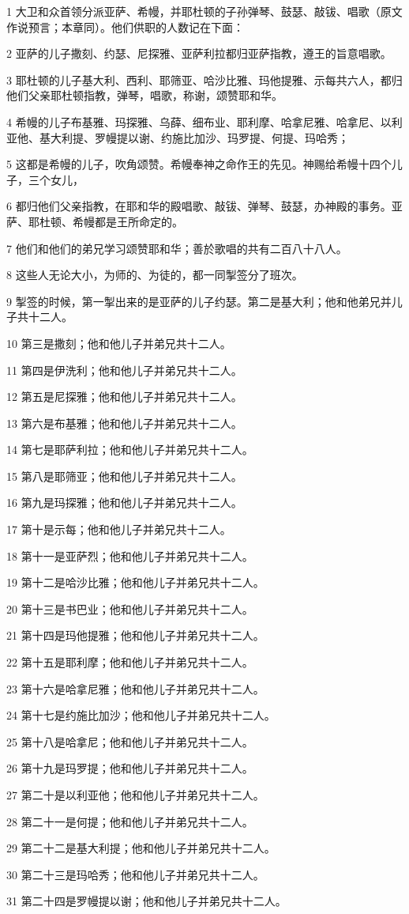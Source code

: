 \par 1 大卫和众首领分派亚萨、希幔，并耶杜顿的子孙弹琴、鼓瑟、敲钹、唱歌（原文作说预言；本章同）。他们供职的人数记在下面：
\par 2 亚萨的儿子撒刻、约瑟、尼探雅、亚萨利拉都归亚萨指教，遵王的旨意唱歌。
\par 3 耶杜顿的儿子基大利、西利、耶筛亚、哈沙比雅、玛他提雅、示每共六人，都归他们父亲耶杜顿指教，弹琴，唱歌，称谢，颂赞耶和华。
\par 4 希幔的儿子布基雅、玛探雅、乌薛、细布业、耶利摩、哈拿尼雅、哈拿尼、以利亚他、基大利提、罗幔提以谢、约施比加沙、玛罗提、何提、玛哈秀；
\par 5 这都是希幔的儿子，吹角颂赞。希幔奉神之命作王的先见。神赐给希幔十四个儿子，三个女儿，
\par 6 都归他们父亲指教，在耶和华的殿唱歌、敲钹、弹琴、鼓瑟，办神殿的事务。亚萨、耶杜顿、希幔都是王所命定的。
\par 7 他们和他们的弟兄学习颂赞耶和华；善於歌唱的共有二百八十八人。
\par 8 这些人无论大小，为师的、为徒的，都一同掣签分了班次。
\par 9 掣签的时候，第一掣出来的是亚萨的儿子约瑟。第二是基大利；他和他弟兄并儿子共十二人。
\par 10 第三是撒刻；他和他儿子并弟兄共十二人。
\par 11 第四是伊洗利；他和他儿子并弟兄共十二人。
\par 12 第五是尼探雅；他和他儿子并弟兄共十二人。
\par 13 第六是布基雅；他和他儿子并弟兄共十二人。
\par 14 第七是耶萨利拉；他和他儿子并弟兄共十二人。
\par 15 第八是耶筛亚；他和他儿子并弟兄共十二人。
\par 16 第九是玛探雅；他和他儿子并弟兄共十二人。
\par 17 第十是示每；他和他儿子并弟兄共十二人。
\par 18 第十一是亚萨烈；他和他儿子并弟兄共十二人。
\par 19 第十二是哈沙比雅；他和他儿子并弟兄共十二人。
\par 20 第十三是书巴业；他和他儿子并弟兄共十二人。
\par 21 第十四是玛他提雅；他和他儿子并弟兄共十二人。
\par 22 第十五是耶利摩；他和他儿子并弟兄共十二人。
\par 23 第十六是哈拿尼雅；他和他儿子并弟兄共十二人。
\par 24 第十七是约施比加沙；他和他儿子并弟兄共十二人。
\par 25 第十八是哈拿尼；他和他儿子并弟兄共十二人。
\par 26 第十九是玛罗提；他和他儿子并弟兄共十二人。
\par 27 第二十是以利亚他；他和他儿子并弟兄共十二人。
\par 28 第二十一是何提；他和他儿子并弟兄共十二人。
\par 29 第二十二是基大利提；他和他儿子并弟兄共十二人。
\par 30 第二十三是玛哈秀；他和他儿子并弟兄共十二人。
\par 31 第二十四是罗幔提以谢；他和他儿子并弟兄共十二人。

